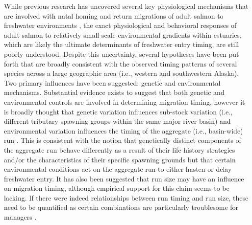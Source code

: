 \documentclass[12pt,]{book}
\theoremstyle{definition}
\theoremstyle{definition}
\theoremstyle{definition}
\theoremstyle{remark}
\begin{document}
While previous research has uncovered several key physiological
mechanisms that are involved with natal homing
\citep{hasler-scholz-1983} and return migrations of adult salmon to
freshwater environments
\citep{cooperman-etal-2010, cooke-etal-2008, hinch-etal-2012}, the exact
physiological and behavioral responses of adult salmon to relatively
small-scale environmental gradients within estuaries, which are likely
the ultimate determinants of freshwater entry timing, are still poorly
understood. Despite this uncertainty, several hypotheses have been put
forth that are broadly consistent with the observed timing patterns of
several species across a large geographic area (i.e., western and
southwestern Alaska). Two primary influences have been suggested:
genetic \citep{quinn-etal-2000, anderson-beer-2009, omalley-etal-2010}
and environmental \citep{hodgson-etal-2006, keefer-etal-2008}
mechanisms. Substantial evidence exists to suggest that both genetic and
environmental controls are involved in determining migration timing,
however it is broadly thought that genetic variation influences
sub-stock variation (i.e., different tributary spawning groups within
the same major river basin) and environmental variation influences the
timing of the aggregate (i.e., basin-wide) run
\citep{keefer-etal-2008, anderson-beer-2009}. This is consistent with
the notion that genetically distinct components of the aggregate run
behave differently as a result of their life history strategies and/or
the characteristics of their specific spawning grounds
\citetext{\citealp[e.g., sub-stocks that must travel farther in-river to
reach spawning grounds enter freshwater
earlier;][]{clark-etal-2015}; \citealp[sub-stocks that spawn in
tributaries influenced by warmer lakes enable later
spawning;][]{burger-etal-1985}} but that certain environmental
conditions act on the aggregate run to either hasten or delay freshwater
entry. It has also been suggested that run size may have an influence on
migration timing, although empirical support for this claim seems to be
lacking. If there were indeed relationships between run timing and run
size, these need to be quantified as certain combinations are
particularly troublesome for managers \citep[e.g., small/early runs and
large/late runs appear the same early
in-season;][]{adkison-cunningham-2015}.
\end{document}
